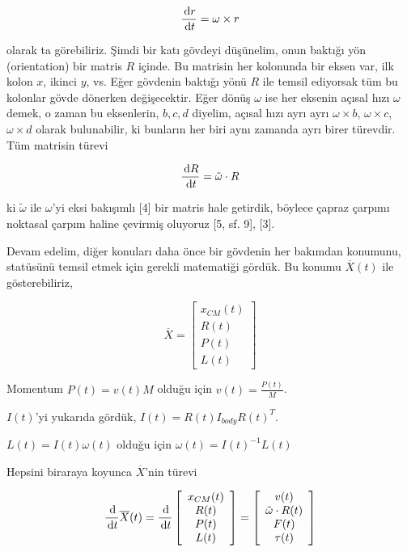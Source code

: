 \documentclass[12pt,fleqn]{article}\usepackage{../../common}
\begin{document}
$$
\frac{\,\mathrm{d} r}{\,\mathrm{d} t} = \omega \times r
$$

olarak ta görebiliriz. Şimdi bir katı gövdeyi düşünelim, onun baktığı yön
(orientation) bir matris $R$ içinde. Bu matrisin her kolonunda bir eksen var,
ilk kolon $x$, ikinci $y$, vs. Eğer gövdenin baktığı yönü $R$ ile temsil
ediyorsak tüm bu kolonlar gövde dönerken değişecektir. Eğer dönüş $\omega$ ise
her eksenin açısal hızı $\omega$ demek, o zaman bu eksenlerin, $b,c,d$ diyelim,
açısal hızı ayrı ayrı $\omega \times b$, $\omega \times c$, $\omega \times d$
olarak bulunabilir, ki bunların her biri aynı zamanda ayrı birer türevdir. Tüm
matrisin türevi

$$
\frac{\,\mathrm{d} R}{\,\mathrm{d} t} = \tilde \omega \cdot R
$$

ki $\tilde \omega$ ile $\omega$'yi eksi bakışımlı [4] bir matris hale getirdik,
böylece çapraz çarpımı noktasal çarpım haline çevirmiş oluyoruz [5, sf. 9], [3].

Devam edelim, diğer konuları daha önce bir gövdenin her bakımdan konumunu,
statüsünü temsil etmek için gerekli matematiği gördük. Bu konumu
$\overline{X}(t)$ ile gösterebiliriz,

$$
\overline{X} = \left[\begin{array}{c}
x_{CM}(t) \\ R(t) \\ P(t) \\ L(t)
\end{array}\right]
$$

Momentum $P(t) = v(t) M$ olduğu için $v(t) = \frac{P(t)}{M}$.

$I(t)$'yi yukarıda gördük, $I(t) = R(t) I_{body} R(t)^T$.

$L(t) = I(t) \omega(t)$ olduğu için $\omega(t) = I(t)^{-1} L(t)$

Hepsini biraraya koyunca $\overline{X}$'nin türevi

$$
\frac{\,\mathrm{d}}{\,\mathrm{d} t} \overline{X}(t) =
\frac{\,\mathrm{d}}{\,\mathrm{d} t}
\left[\begin{array}{c}
x_{CM}(t) \\ R(t) \\ P(t) \\ L(t)
\end{array}\right]
=
\left[\begin{array}{c}
v(t) \\ \tilde \omega \cdot R(t) \\ F(t) \\ \tau(t)
\end{array}\right]
$$
\end{document}

